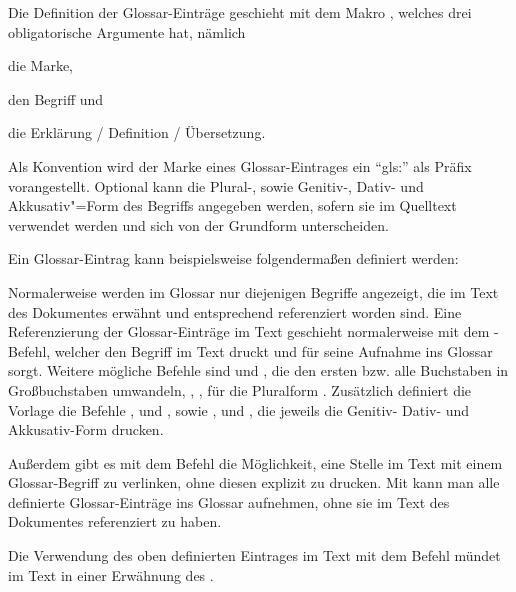 Die Definition der Glossar-Einträge geschieht mit dem Makro ,
welches drei obligatorische Argumente hat, nämlich
\begin{itemize*}
\item die Marke,
\item den Begriff und
\item die Erklärung / Definition / Übersetzung.
\end{itemize*}
Als Konvention wird der Marke eines Glossar-Eintrages ein \enquote{gls:} als Präfix vorangestellt.
Optional kann die Plural-, sowie Genitiv-, Dativ- und Akkusativ"=Form des Begriffs angegeben werden,
sofern sie im Quelltext verwendet werden und sich von der Grundform unterscheiden.

Ein Glossar-Eintrag kann beispielsweise folgendermaßen definiert werden:
\begin{latex}[caption={Definition eines Glossar-Eintrages},label={lst:GlossEntry}]
\end{latex}

Normalerweise werden im Glossar nur diejenigen Begriffe angezeigt,
die im Text des Dokumentes erwähnt und entsprechend referenziert worden sind.
Eine Referenzierung der Glossar-Einträge im Text geschieht normalerweise mit dem
-Befehl,
welcher den Begriff im Text druckt und für seine Aufnahme ins Glossar sorgt.
Weitere mögliche Befehle sind  und ,
die den ersten bzw. alle Buchstaben in Großbuchstaben umwandeln,
, ,  für die Pluralform \usw.
Zusätzlich definiert die Vorlage die Befehle
,  und , sowie
,  und ,
die jeweils die Genitiv- Dativ- und Akkusativ-Form drucken.

Außerdem gibt es mit dem Befehl  die Möglichkeit,
eine Stelle im Text mit einem Glossar-Begriff zu verlinken, ohne diesen explizit zu drucken.
Mit  kann man alle definierte Glossar-Einträge ins Glossar aufnehmen,
ohne sie im Text des Dokumentes referenziert zu haben.

Die Verwendung des oben definierten Eintrages im Text mit dem Befehl
 mündet im Text in einer Erwähnung des .



